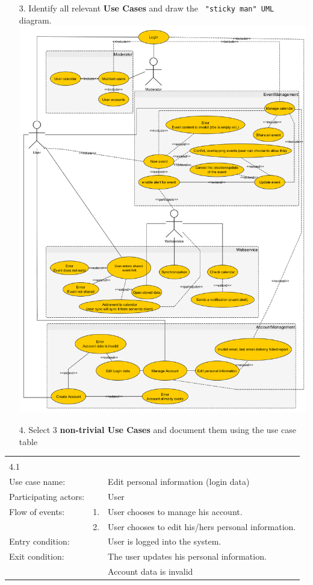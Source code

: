 \documentclass[a4paper]{article}
\begin{document}
	\begin{enumerate}
		\item[3.] Identify all  relevant \textbf{Use Cases} and draw the \verb= "sticky man" UML= diagram.\\
		\includegraphics[scale = 0.38]{UserCases.png}\\
		\pagebreak{}
		\item[4.] Select 3 \textbf{non-trivial Use Cases} and document them using the use case table\\
	\end{enumerate}
\begin{tabular}{l r @{} l}
	\multicolumn{2}{c}{} \\
	4.1&&\\
	\hline
	Use case name:	&&Edit personal information (login data)\\
	\hline
	Participating actors:&&User \\
	\hline
	Flow of events:	&1.&User chooses to manage his account.\\
				&2.&User chooses to edit his/hers personal information.\\
	\hline
	Entry condition:	&&User is logged into the system.\\
	\hline
	Exit condition:	&&The user updates his personal information.\\
    &&Account data is invalid\\
	\hline
\end{tabular}
\end{document}
